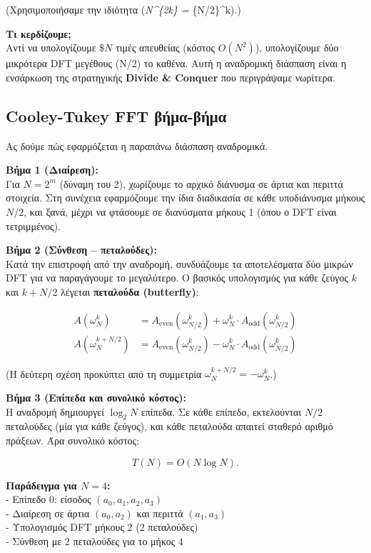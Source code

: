 \documentclass[a4paper, 11pt]{article}
\begin{document}
(Χρησιμοποιήσαμε την ιδιότητα (\omega\emph{N\^{}\{2k\} =
\omega}\{N/2\}\^{}k).)

\textbf{Τι κερδίζουμε;}\\
Αντί να υπολογίζουμε \$\(N\) τιμές απευθείας (κόστος \(O(N^2)\)),
υπολογίζουμε δύο μικρότερα DFT μεγέθους (N/2) το καθένα. Αυτή η
αναδρομική διάσπαση είναι η ενσάρκωση της στρατηγικής \textbf{Divide \&
Conquer} που περιγράψαμε νωρίτερα.

\subsection{Cooley-Tukey FFT
βήμα-βήμα}\label{cooley-tukey-fft-ux3b2ux3aeux3bcux3b1-ux3b2ux3aeux3bcux3b1}

Ας δούμε πώς εφαρμόζεται η παραπάνω διάσπαση αναδρομικά.

\textbf{Βήμα 1 (Διαίρεση):}\\
Για \(N = 2^m\) (δύναμη του 2), χωρίζουμε το αρχικό διάνυσμα σε άρτια
και περιττά στοιχεία. Στη συνέχεια εφαρμόζουμε την ίδια διαδικασία σε
κάθε υποδιάνυσμα μήκους \(N/2\), και ξανά, μέχρι να φτάσουμε σε
διανύσματα μήκους 1 (όπου ο DFT είναι τετριμμένος).

\textbf{Βήμα 2 (Σύνθεση -- πεταλούδες):}\\
Κατά την επιστροφή από την αναδρομή, συνδυάζουμε τα αποτελέσματα δύο
μικρών DFT για να παραγάγουμε το μεγαλύτερο. Ο βασικός υπολογισμός για
κάθε ζεύγος \(k\) και \(k+N/2\) λέγεται \textbf{πεταλούδα (butterfly)}:

\[
\begin{aligned}
A(\omega_N^k) &= A_{\text{even}}(\omega_{N/2}^k) + \omega_N^k \cdot A_{\text{odd}}(\omega_{N/2}^k) \\
A(\omega_N^{k+N/2}) &= A_{\text{even}}(\omega_{N/2}^k) - \omega_N^k \cdot A_{\text{odd}}(\omega_{N/2}^k)
\end{aligned}
\]

(Η δεύτερη σχέση προκύπτει από τη συμμετρία
\(\omega_N^{k+N/2} = -\omega_N^k\).)

\textbf{Βήμα 3 (Επίπεδα και συνολικό κόστος):}\\
Η αναδρομή δημιουργεί \(\log_2 N\) επίπεδα. Σε κάθε επίπεδο, εκτελούνται
\(N/2\) πεταλούδες (μία για κάθε ζεύγος), και κάθε πεταλούδα απαιτεί
σταθερό αριθμό πράξεων. Άρα συνολικό κόστος:

\[
T(N) = O(N \log N).
\]

\textbf{Παράδειγμα για \(N=4\):}\\
- Επίπεδο 0: είσοδος \((a_0,a_1,a_2,a_3)\)\\
- Διαίρεση σε άρτια \((a_0,a_2)\) και περιττά \((a_1,a_3)\)\\
- Υπολογισμός DFT μήκους 2 (2 πεταλούδες)\\
- Σύνθεση με 2 πεταλούδες για το μήκος 4
\end{document}
